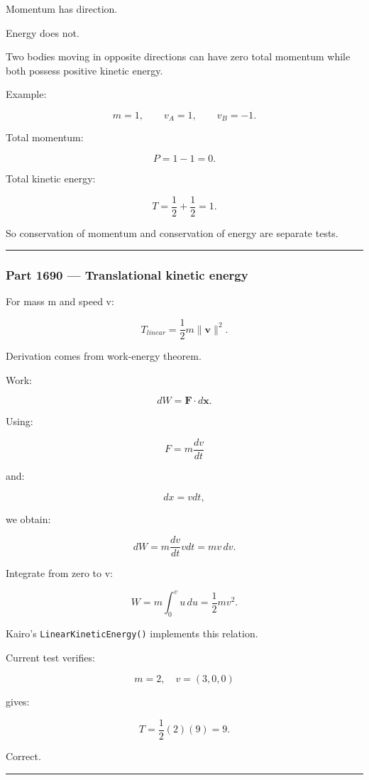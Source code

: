Momentum has direction.

Energy does not.

Two bodies moving in opposite directions can have zero total momentum while both possess positive kinetic energy.

Example:

\[
m=1,
\qquad
v_A=1,
\qquad
v_B=-1.
\]

Total momentum:

\[
P=1-1=0.
\]

Total kinetic energy:

\[
T=
\frac12+
\frac12
=
1.
\]

So conservation of momentum and conservation of energy are separate tests.

\begin{center}\rule{0.5\linewidth}{0.5pt}\end{center}

\subsubsection{Part 1690 --- Translational kinetic energy}\label{part-1690-translational-kinetic-energy}

For mass m and speed v:

\[
\boxed{
T_{linear}
=
\frac12m\|\mathbf v\|^2.
}
\]

Derivation comes from work-energy theorem.

Work:

\[
dW
=
\mathbf F\cdot d\mathbf x.
\]

Using:

\[
F=m\frac{dv}{dt}
\]

and:

\[
dx=vdt,
\]

we obtain:

\[
dW
=
m\frac{dv}{dt}vdt
=
mv\,dv.
\]

Integrate from zero to v:

\[
W
=
m\int_0^v u\,du
=
\frac12mv^2.
\]

Kairo's \texttt{LinearKineticEnergy()} implements this relation.

Current test verifies:

\[
m=2,
\quad
v=(3,0,0)
\]

gives:

\[
T=
\frac12(2)(9)=9.
\]

Correct.

\begin{center}\rule{0.5\linewidth}{0.5pt}\end{center}

